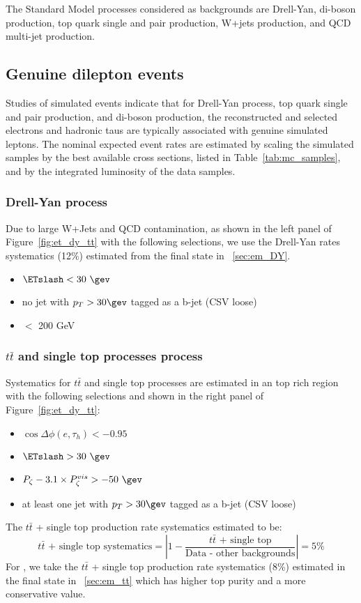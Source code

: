 The Standard Model processes considered as backgrounds are Drell-Yan,
di-boson production, top quark single and pair production, W+jets
production, and QCD multi-jet production.

\subsection{Genuine dilepton events}

Studies of simulated events indicate that for Drell-Yan process, top
quark single and pair production, and di-boson production, the
reconstructed and selected electrons and hadronic taus are typically
associated with genuine simulated leptons.  The nominal expected event
rates are estimated by scaling the simulated samples by the best
available cross sections, listed in Table~\ref{tab:mc_samples}, and by
the integrated luminosity of the data samples.

\subsubsection{Drell-Yan process}
Due to large W+Jets and QCD contamination, as shown in the left panel of 
Figure~\ref{fig:et_dy_tt} with the following selections, we use the 
Drell-Yan rates systematics (12\%) estimated from the \tetm final state in 
~\ref{sec:em_DY}.
\begin{itemize}
  \item $\ETslash<30~\gev$
  \item no jet with $p_T>30\gev$ tagged as a b-jet (CSV loose)
  \item \meffetau $<$ 200 GeV
\end{itemize}

\subsubsection{$t\bar{t}$ and single top processes process}
Systematics for $t\bar{t}$ and single top processes are estimated in an top rich 
region with the following selections and shown in the right panel of 
Figure~\ref{fig:et_dy_tt}:
\begin{itemize}
  \item $\cos{\Delta \phi (e,\tau_{h})}<-0.95$
  \item $\ETslash>30~\gev$
  \item $P_{\zeta}- 3.1 \times P_{\zeta}^{vis} > -50~\gev$
  \item at least one jet with $p_T>30\gev$ tagged as a b-jet (CSV loose)
\end{itemize}
The $t\bar{t}$ + single top production rate systematics estimated to be:
\begin{equation}\label{eq:tt}
\text{$t\bar{t}$ + single top systematics} = \left| 1 - \frac{\text{$t\bar{t}$ + single top}}{\text{Data - other backgrounds}}\right| = 5\%
\end{equation}
For \teth, we take the $t\bar{t}$ + single top production rate systematics (8\%)
estimated in the \tetm final state in ~\ref{sec:em_tt} which has higher top purity
and a more conservative value.

